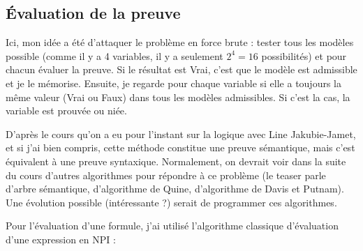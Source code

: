 \documentclass[12pt, algo]{cours}
\begin{document}
\begin{algorithm}[H]
\end{algorithm}

\subsection{Évaluation de la preuve}

Ici, mon idée a été d'attaquer le problème en force brute : tester tous les modèles possible (comme il y a 4 variables, il y a seulement $2^4=16$ possibilités) et pour chacun évaluer la preuve. Si le résultat est Vrai, c'est que le modèle est admissible et je le mémorise. Ensuite, je regarde pour chaque variable si elle a toujours la même valeur (Vrai ou Faux) dans tous les modèles admissibles. Si c'est la cas, la variable est prouvée ou niée.

\medskip
D'après le cours qu'on a eu pour l'instant sur la logique avec Line Jakubie-Jamet, et si j'ai bien compris, cette méthode constitue une preuve sémantique, mais c'est équivalent à une preuve syntaxique. Normalement, on devrait voir dans la suite du cours d'autres algorithmes pour répondre à ce problème (le teaser parle d'arbre sémantique, d'algorithme de Quine, d'algorithme de Davis et Putnam). Une évolution possible (intéressante ?) serait de programmer ces algorithmes.

\medskip

Pour l'évaluation d'une formule, j'ai utilisé l'algorithme classique d'évaluation d'une expression en NPI :
\end{document}
